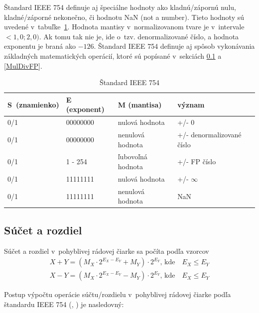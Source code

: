 Štandard IEEE 754 definuje aj špeciálne hodnoty ako kladnú/zápornú nulu, kladné/záporné nekonečno, či hodnotu NaN (not a number). Tieto hodnoty sú uvedené v~tabuľke~\ref{standard_IEEE754}.
Hodnota mantisy v~normalizovanom tvare je v~intervale $ <1,0; 2,0) $. Ak tomu tak nie je, ide o~tzv. denormalizované číslo, a hodnota exponentu je braná ako $ -126 $. Štandard IEEE 754 definuje aj spôsob vykonávania základných matematických operácií, ktoré sú popísané v~sekciách \ref{PlusMinusFP} a \ref{MulDivFP}.

\bigskip
\begin{table}[h]
\centering
\begin{tabular}{|l|l|l|l|}
\hline
\rowcolor[HTML]{C0C0C0} 
S~(znamienko) & E (exponent) & M (mantisa)       & význam                    \\ \hline
0/1           & 00000000     & nulová hodnota    & +/- 0                     \\ \hline
0/1           & 00000000     & nenulová hodnota  & +/- denormalizované číslo \\ \hline
0/1           & 1 - 254      & ľubovoľná hodnota & +/- FP číslo              \\ \hline
0/1           & 11111111     & nulová hodnota    & +/- $ \infty  $           \\ \hline
0/1           & 11111111     & nenulová hodnota  & NaN                       \\ \hline
\end{tabular}
\caption{Štandard IEEE 754 \cite{FPOnline}}
\label{standard_IEEE754}
\end{table}

\newpage
\subsection{Súčet a rozdiel} \label{PlusMinusFP}
Súčet a rozdiel v~pohyblivej rádovej čiarke sa počíta podľa vzorcov
\begin{eqnarray}
X + Y = (M_{X}\cdot 2^{E_{X} - E_{Y}} + M_{Y})\cdot 2^{E_{Y}} \text{, kde} \quad E_{X} \leq E_{Y} \\
X - Y = (M_{X}\cdot 2^{E_{X} - E_{Y}} - M_{Y})\cdot 2^{E_{Y}} \text{, kde} \quad E_{X} \leq E_{Y}
\end{eqnarray}

Postup výpočtu operácie súčtu/rozdielu v~pohyblivej rádovej čiarke podľa štandardu IEEE 754 (\cite{FPOnline_operacie}, \cite{CamborBP}) je nasledovný:

